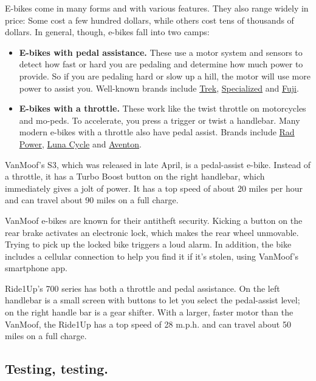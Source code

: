 E-bikes come in many forms and with various features. They also range
widely in price: Some cost a few hundred dollars, while others cost tens
of thousands of dollars. In general, though, e-bikes fall into two
camps:

\begin{itemize}
\item
  \textbf{E-bikes with pedal assistance.} These use a motor system and
  sensors to detect how fast or hard you are pedaling and determine how
  much power to provide. So if you are pedaling hard or slow up a hill,
  the motor will use more power to assist you. Well-known brands include
  \href{https://www.trekbikes.com/us/en_US/ebike_faq/}{Trek},
  \href{https://www.specialized.com/nz/en/stories/turbo-faq}{Specialized}
  and \href{https://www.fujibikes.com/usa/bikes/electric/}{Fuji}.
\item
  \textbf{E-bikes with a throttle.} These work like the twist throttle
  on motorcycles and mo-peds. To accelerate, you press a trigger or
  twist a handlebar. Many modern e-bikes with a throttle also have pedal
  assist. Brands include
  \href{https://www.radpowerbikes.com/products/radwagon-electric-cargo-bike?variant=32100542283872\#specs}{Rad
  Power}, \href{https://lunacycle.com/}{Luna Cycle} and
  \href{https://www.aventon.com/products/aventon-pace-500-complete-bike}{Aventon}.
\end{itemize}

VanMoof's S3, which was released in late April, is a pedal-assist
e-bike. Instead of a throttle, it has a Turbo Boost button on the right
handlebar, which immediately gives a jolt of power. It has a top speed
of about 20 miles per hour and can travel about 90 miles on a full
charge.

VanMoof e-bikes are known for their antitheft security. Kicking a button
on the rear brake activates an electronic lock, which makes the rear
wheel unmovable. Trying to pick up the locked bike triggers a loud
alarm. In addition, the bike includes a cellular connection to help you
find it if it's stolen, using VanMoof's smartphone app.

Ride1Up's 700 series has both a throttle and pedal assistance. On the
left handlebar is a small screen with buttons to let you select the
pedal-assist level; on the right handle bar is a gear shifter. With a
larger, faster motor than the VanMoof, the Ride1Up has a top speed of 28
m.p.h. and can travel about 50 miles on a full charge.

\hypertarget{testing-testing}{%
\subsection{Testing, testing.}\label{testing-testing}}

